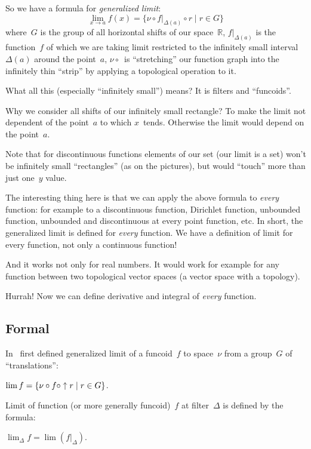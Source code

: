 \documentclass{amsart}
\begin{document}
So we have a formula for \emph{generalized limit}:
\[ \lim_{x\to a} f(x) =
\{ \nu \circ f|_{\Delta(a)} \circ r \mid r\in G \} \]
where~$G$ is the group of all horizontal shifts of our space~$\mathbb{R}$, $f|_{\Delta(a)}$ is the function~$f$ of which we are taking limit restricted to the infinitely small interval~$\Delta(a)$ around the point~$a$, $\nu\circ{}$~is ``stretching'' our function graph into the infinitely thin ``strip'' by applying a topological operation to it.

What all this (especially ``infinitely small'') means? It is filters and ``funcoids''.

Why we consider all shifts of our infinitely small rectangle? To make the limit not dependent of the point~$a$ to which $x$~tends. Otherwise the limit would depend on the point~$a$.

Note that for discontinuous functions elements of our set (our limit is a set) won't be infinitely small ``rectangles'' (as on the pictures), but would ``touch'' more than just one~$y$ value.

The interesting thing here is that we can apply the above formula to \emph{every} function: for example to a discontinuous function, Dirichlet function, unbounded function, unbounded and discontinuous at every point function, etc. In short, the generalized limit is defined for \emph{every} function. We have a definition of limit for every function, not only a continuous function!

And it works not only for real numbers. It would work for example for any function between two topological vector spaces (a vector space with a topology).

Hurrah! Now we can define derivative and integral of \emph{every} function.

\subsection{Formal}

In~\cite{volume-1-edition1} first defined generalized limit of
a funcoid~$f$ to space~$\nu$ from a group~$G$ of ``translations'':

\begin{defn}
$\lim f=\left\{ \nu\circ f\circ\uparrow r \mid r\in G \right\}$.
\end{defn}

Limit of function (or more generally funcoid)~$f$ at filter~$\Delta$ is defined by the formula:

\begin{defn}
$\lim_{\Delta} f=\lim(f|_{\Delta})$.
\end{defn}
\end{document}
